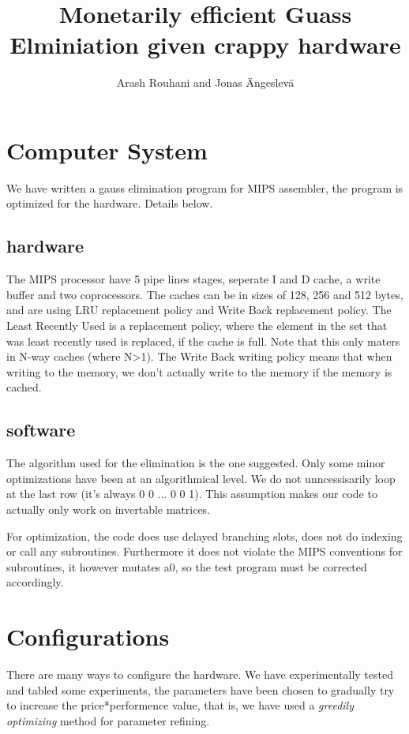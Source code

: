 \documentclass[a4paper,11pt]{article}
\title{Monetarily efficient Guass Elminiation given crappy hardware}
\author{Arash Rouhani and Jonas Ängeslevä}
\begin{document}
\maketitle

\begin{abstract}

\end{abstract}

\section{Computer System}
We have written a gauss elimination program for MIPS assembler, the program is optimized for the hardware. Details below.
\subsection{hardware}
The MIPS processor have 5 pipe lines stages, seperate I and D cache, a write buffer and two coprocessors.
The caches can be in sizes of 128, 256 and 512 bytes, and are using LRU replacement policy and Write Back replacement policy.
The Least Recently Used is a replacement policy, where the element in the set that was least recently used is replaced, if the cache is full. Note that this only maters in N-way caches (where N>1).
The Write Back writing policy means that when writing to the memory, we don't actually write to the memory if the memory is cached. 
\subsection{software}
The algorithm used for the elimination is the one suggested.
Only some minor optimizations have been at an algorithmical level. We do not unncessisarily loop at the last row (it's always 0 0 ... 0 0 1).
This assumption makes our code to actually only work on invertable matrices.

For optimization, the code does use delayed branching slots, does not do indexing or call any subroutines. 
Furthermore it does not violate the MIPS conventions for subroutines, it however mutates a0, so the test program must be corrected accordingly.
\section{Configurations}
There are many ways to configure the hardware. We have experimentally tested and tabled some experiments, the parameters have been chosen to gradually try to increase the price*performence value, that is, we have used a \emph{greedily optimizing} method for parameter refining.
\end{document}
